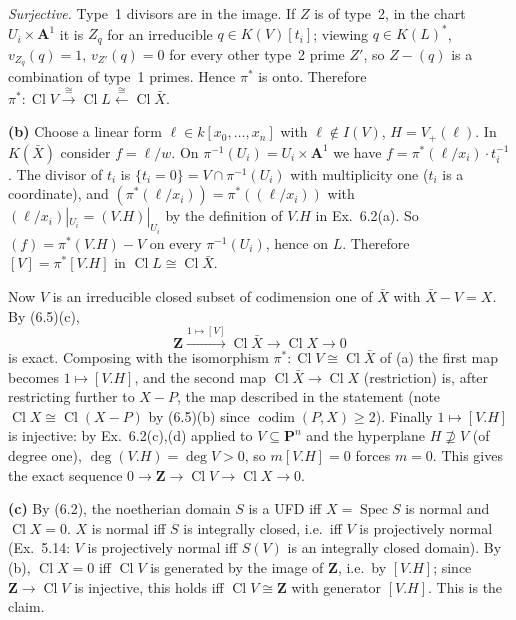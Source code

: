 \documentclass[11pt]{article}
\begin{document}
\emph{Surjective.} Type~1 divisors are in the image. If $Z$ is of type~2, in the chart $U_i\times\mathbf A^1$ it is $Z_q$ for an irreducible $q\in K(V)[t_i]$; viewing $q\in K(L)^*$, $v_{Z_q}(q)=1$, $v_{Z'}(q)=0$ for every other type~2 prime $Z'$, so $Z-(q)$ is a combination of type~1 primes. Hence $\pi^*$ is onto. Therefore $\pi^*:\operatorname{Cl}V\xrightarrow{\ \cong\ }\operatorname{Cl}L\xleftarrow{\ \cong\ }\operatorname{Cl}\bar X$.

\textbf{(b)} Choose a linear form $\ell\in k[x_0,\dots,x_n]$ with $\ell\notin I(V)$, $H=V_+(\ell)$. In $K(\bar X)$ consider $f=\ell/w$. On $\pi^{-1}(U_i)=U_i\times\mathbf A^1$ we have $f=\pi^*(\ell/x_i)\cdot t_i^{-1}$. The divisor of $t_i$ is $\{t_i=0\}=V\cap\pi^{-1}(U_i)$ with multiplicity one ($t_i$ is a coordinate), and $(\pi^*(\ell/x_i))=\pi^*((\ell/x_i))$ with $(\ell/x_i)|_{U_i}=(V.H)|_{U_i}$ by the definition of $V.H$ in Ex.~6.2(a). So $(f)=\pi^*(V.H)-V$ on every $\pi^{-1}(U_i)$, hence on $L$. Therefore $[V]=\pi^*[V.H]$ in $\operatorname{Cl}L\cong\operatorname{Cl}\bar X$.

Now $V$ is an irreducible closed subset of codimension one of $\bar X$ with $\bar X-V=X$. By (6.5)(c),
\[
\mathbf Z\xrightarrow{1\mapsto[V]}\operatorname{Cl}\bar X\longrightarrow\operatorname{Cl}X\to0
\]
is exact. Composing with the isomorphism $\pi^*:\operatorname{Cl}V\cong\operatorname{Cl}\bar X$ of (a) the first map becomes $1\mapsto[V.H]$, and the second map $\operatorname{Cl}\bar X\to\operatorname{Cl}X$ (restriction) is, after restricting further to $X-P$, the map described in the statement (note $\operatorname{Cl}X\cong\operatorname{Cl}(X-P)$ by (6.5)(b) since $\operatorname{codim}(P,X)\ge2$). Finally $1\mapsto[V.H]$ is injective: by Ex.~6.2(c),(d) applied to $V\subseteq\mathbf P^n$ and the hyperplane $H\not\supseteq V$ (of degree one), $\deg(V.H)=\deg V>0$, so $m[V.H]=0$ forces $m=0$. This gives the exact sequence $0\to\mathbf Z\to\operatorname{Cl}V\to\operatorname{Cl}X\to0$.

\textbf{(c)} By (6.2), the noetherian domain $S$ is a UFD iff $X=\operatorname{Spec}S$ is normal and $\operatorname{Cl}X=0$. $X$ is normal iff $S$ is integrally closed, i.e.\ iff $V$ is projectively normal (Ex.~5.14: $V$ is projectively normal iff $S(V)$ is an integrally closed domain). By (b), $\operatorname{Cl}X=0$ iff $\operatorname{Cl}V$ is generated by the image of $\mathbf Z$, i.e.\ by $[V.H]$; since $\mathbf Z\to\operatorname{Cl}V$ is injective, this holds iff $\operatorname{Cl}V\cong\mathbf Z$ with generator $[V.H]$. This is the claim.
\end{document}
